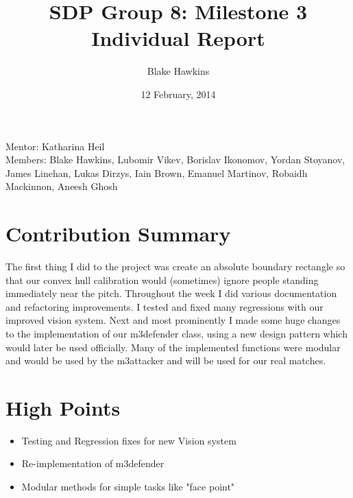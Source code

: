 \documentclass[a4paper,11pt]{article}
\title{SDP Group 8: Milestone 3 Individual Report} %
\author{Blake Hawkins} %
\date{12 February, 2014} %
\begin{document}
\maketitle %

\begin{center}
Mentor: Katharina Heil %
\\
Members: Blake Hawkins, %
Lubomir Vikev,
Borislav Ikonomov,
Yordan Stoyanov,
James Linehan,
Lukas Dirzys,
Iain Brown,
Emanuel Martinov,
Robaidh Mackinnon,
Aneesh Ghosh

\end{center}


\section{Contribution Summary}

The first thing I did to the project was create an absolute boundary rectangle so that our convex hull calibration would (sometimes) ignore people standing immediately near the pitch. Throughout the week I did various documentation and refactoring improvements. I tested and fixed many regressions with our improved vision system. Next and most prominently I made some huge changes to the implementation of our m3defender class, using a new design pattern which would later be used officially. Many of the implemented functions were modular and would be used by the m3attacker and will be used for our real matches.
 

\section{High Points}

\begin{itemize}
\item Testing and Regression fixes for new Vision system
\item Re-implementation of m3defender
\item Modular methods for simple tasks like "face point"
\end{itemize}
\end{document}

